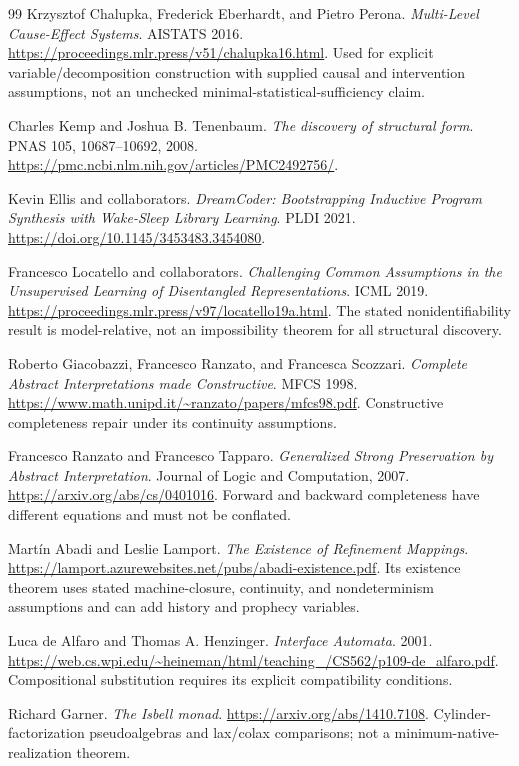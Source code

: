 \documentclass[11pt]{article}
\theoremstyle{remark}
\begin{document}
\begin{thebibliography}{99}
Krzysztof Chalupka, Frederick Eberhardt, and Pietro Perona.
\emph{Multi-Level Cause-Effect Systems}. AISTATS 2016.
\url{https://proceedings.mlr.press/v51/chalupka16.html}.
Used for explicit variable/decomposition construction with supplied causal and intervention assumptions, not an unchecked minimal-statistical-sufficiency claim.

Charles Kemp and Joshua B. Tenenbaum.
\emph{The discovery of structural form}. PNAS 105, 10687--10692, 2008.
\url{https://pmc.ncbi.nlm.nih.gov/articles/PMC2492756/}.

Kevin Ellis and collaborators.
\emph{DreamCoder: Bootstrapping Inductive Program Synthesis with Wake-Sleep Library Learning}. PLDI 2021.
\url{https://doi.org/10.1145/3453483.3454080}.

Francesco Locatello and collaborators.
\emph{Challenging Common Assumptions in the Unsupervised Learning of Disentangled Representations}. ICML 2019.
\url{https://proceedings.mlr.press/v97/locatello19a.html}.
The stated nonidentifiability result is model-relative, not an impossibility theorem for all structural discovery.

Roberto Giacobazzi, Francesco Ranzato, and Francesca Scozzari.
\emph{Complete Abstract Interpretations made Constructive}. MFCS 1998.
\url{https://www.math.unipd.it/~ranzato/papers/mfcs98.pdf}.
Constructive completeness repair under its continuity assumptions.

Francesco Ranzato and Francesco Tapparo.
\emph{Generalized Strong Preservation by Abstract Interpretation}.
Journal of Logic and Computation, 2007.
\url{https://arxiv.org/abs/cs/0401016}.
Forward and backward completeness have different equations and must not be conflated.

Mart\'in Abadi and Leslie Lamport.
\emph{The Existence of Refinement Mappings}.
\url{https://lamport.azurewebsites.net/pubs/abadi-existence.pdf}.
Its existence theorem uses stated machine-closure, continuity, and nondeterminism assumptions and can add history and prophecy variables.

Luca de Alfaro and Thomas A. Henzinger.
\emph{Interface Automata}. 2001.
\url{https://web.cs.wpi.edu/~heineman/html/teaching_/CS562/p109-de_alfaro.pdf}.
Compositional substitution requires its explicit compatibility conditions.

Richard Garner. \emph{The Isbell monad}.
\url{https://arxiv.org/abs/1410.7108}.
Cylinder-factorization pseudoalgebras and lax/colax comparisons; not a minimum-native-realization theorem.


\end{thebibliography}
\end{document}
